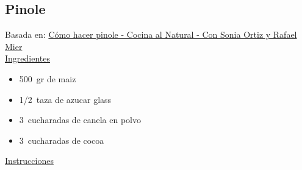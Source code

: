 \subsection{Pinole}

Basada en: \href{https://www.youtube.com/watch?v=ay2mmB5-18g}{Cómo hacer pinole - Cocina al Natural - Con Sonia Ortiz y Rafael Mier} \\

\underline{Ingredientes}

\begin{itemize}
\item \SI{500}{gr} de maiz
\item \SI{1/2}{taza} de azucar glass
\item \SI{3}{cucharadas} de canela en polvo
\item \SI{3}{cucharadas} de cocoa
\end{itemize}


\underline{Instrucciones}

